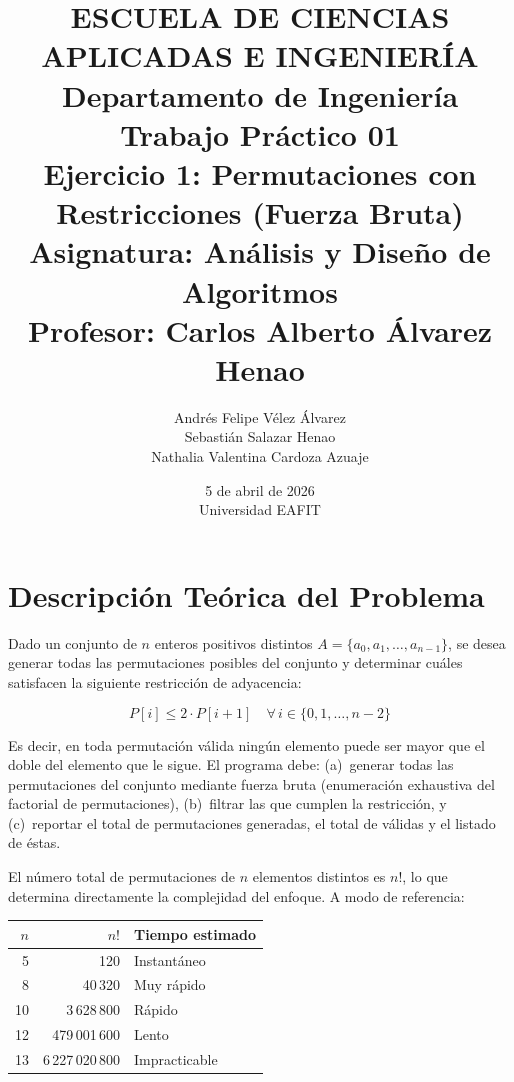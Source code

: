 \documentclass[12pt, a4paper]{article}
\title{
  \textbf{ESCUELA DE CIENCIAS APLICADAS E INGENIERÍA}\\
  \large Departamento de Ingeniería\\[0.5em]
  \Large Trabajo Práctico 01\\[0.3em]
  \LARGE Ejercicio 1: Permutaciones con Restricciones (Fuerza Bruta)\\[0.5em]
  \normalsize Asignatura: Análisis y Diseño de Algoritmos\\
  Profesor: Carlos Alberto Álvarez Henao
}
\author{
  Andrés Felipe Vélez Álvarez \\
  Sebastián Salazar Henao \\
  Nathalia Valentina Cardoza Azuaje
}
\date{5 de abril de 2026 \\ Universidad EAFIT}
\begin{document}
\maketitle
\thispagestyle{empty}
\newpage

\tableofcontents
\newpage

\section{Descripción Teórica del Problema}

Dado un conjunto de $n$ enteros positivos distintos $A = \{a_0, a_1, \ldots, a_{n-1}\}$,
se desea generar todas las permutaciones posibles del conjunto y determinar cuáles
satisfacen la siguiente restricción de adyacencia:

\begin{equation}
  P[i] \leq 2 \cdot P[i+1] \quad \forall\, i \in \{0, 1, \ldots, n-2\}
  \label{eq:restriccion}
\end{equation}

Es decir, en toda permutación válida ningún elemento puede ser mayor que el doble
del elemento que le sigue. El programa debe: (a)~generar todas las permutaciones
del conjunto mediante fuerza bruta (enumeración exhaustiva del factorial de
permutaciones), (b)~filtrar las que cumplen la restricción, y (c)~reportar el total
de permutaciones generadas, el total de válidas y el listado de éstas.

El número total de permutaciones de $n$ elementos distintos es $n!$, lo que determina
directamente la complejidad del enfoque. A modo de referencia:

\begin{center}
\begin{tabular}{rrl}
\toprule
$n$ & $n!$ & Tiempo estimado \\
\midrule
5  & 120            & Instantáneo    \\
8  & 40\,320        & Muy rápido     \\
10 & 3\,628\,800    & Rápido         \\
12 & 479\,001\,600  & Lento          \\
13 & 6\,227\,020\,800 & Impracticable \\
\bottomrule
\end{tabular}
\end{center}
\end{document}
